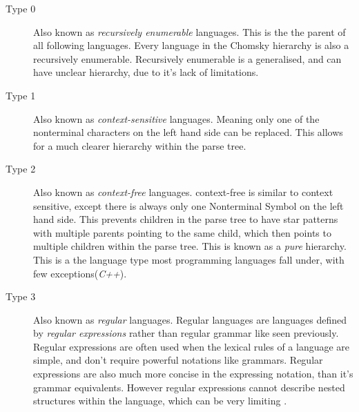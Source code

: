 \begin{description}
    \item[Type 0] Also known as \emph{recursively enumerable} languages. This is the the parent of all following languages. Every language in the Chomsky hierarchy is also a recursively enumerable. Recursively enumerable is a generalised, and can have unclear hierarchy, due to it's lack of limitations.
    \item[Type 1] Also known as \emph{context-sensitive} languages. Meaning only one of the nonterminal characters on the left hand side can be replaced. This allows for a much clearer hierarchy within the parse tree.
    \item[Type 2] Also known as \emph{context-free} languages. context-free is similar to context sensitive, except there is always only one Nonterminal Symbol on the left hand side. This prevents children in the parse tree to have star patterns with multiple parents pointing to the same child, which then points to multiple children within the parse tree. This is known as a \emph{pure} hierarchy. This is a the language type most programming languages fall under, with few exceptions(\emph{C++}).
    \item[Type 3]  Also known as \emph{regular} languages. Regular languages are languages defined by \emph{regular expressions} rather than regular grammar like seen previously. Regular expressions are often used when the lexical rules of a language are simple, and don't require powerful notations like grammars. Regular expressions are also much more concise in the expressing notation, than it's grammar equivalents. However regular expressions cannot describe nested structures within the language, which can be very limiting \citep{DragonBook}.
\end{description}
\newpage

